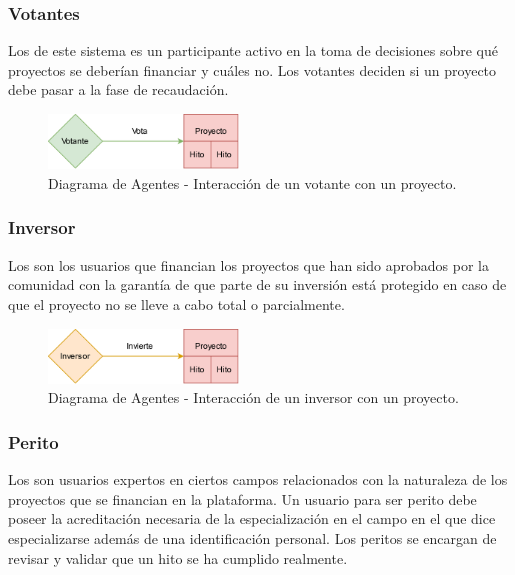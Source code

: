 \subsubsection{Votantes}

Los  de este sistema es un participante activo en la toma de decisiones sobre qué proyectos se deberían financiar y cuáles no. Los votantes deciden si un proyecto debe pasar a la fase de recaudación.

\begin{figure}[H]
        \centering
        \includegraphics[width=0.45\textwidth]{img/diagramas/votante.png}
        \caption{Diagrama de Agentes - Interacción de un votante con un proyecto.}
        \label{fig:configApi}
\end{figure}


\subsubsection{Inversor}

Los  son los usuarios que financian los proyectos que han sido aprobados por la comunidad con la garantía de que parte de su inversión está protegido en caso de que el proyecto no se lleve a cabo total o parcialmente.

\begin{figure}[H]
        \centering
        \includegraphics[width=0.45\textwidth]{img/diagramas/inversor.png}
        \caption{Diagrama de Agentes - Interacción de un inversor con un proyecto.}
        \label{fig:configApi}
\end{figure}

\bigskip

\subsubsection{Perito}

Los  son usuarios expertos en ciertos campos relacionados con la naturaleza de los proyectos que se financian en la plataforma. Un usuario para ser perito debe poseer la acreditación necesaria de la especialización en el campo en el que dice especializarse además de una identificación personal.
Los peritos se encargan de revisar y validar que un hito se ha cumplido realmente.

